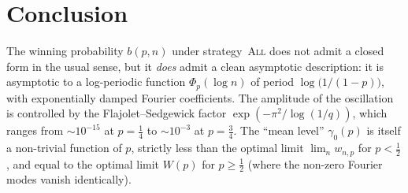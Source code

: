 \documentclass[11pt]{article}
\theoremstyle{definition}
\newcommand{\All}{\textsc{All}}
\begin{document}
\section{Conclusion}

The winning probability $b(p,n)$ under strategy~\All{} does not admit
a closed form in the usual sense, but it \emph{does} admit a clean
asymptotic description: it is asymptotic to a log-periodic function
$\Phi_p(\log n)$ of period $\log\bigl(1/(1-p)\bigr)$, with
exponentially damped Fourier coefficients.
The amplitude of the oscillation is controlled by the Flajolet--Sedgewick
factor $\exp(-\pi^2/\log(1/q))$, which ranges from $\sim 10^{-15}$ at
$p=\tfrac14$ to $\sim 10^{-3}$ at $p=\tfrac34$. The ``mean level''
$\gamma_0(p)$ is itself a non-trivial function of $p$, strictly less
than the optimal limit $\lim_n w_{n,p}$ for $p<\tfrac12$, and equal to
the optimal limit $W(p)$ for $p\ge\tfrac12$ (where the non-zero
Fourier modes vanish identically).
\end{document}
